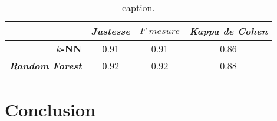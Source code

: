 \begin{table}[H]
    \centering
    \caption{caption.}
    \label{tab:l2ml_results}
    \begin{tabular}{@{}rccc@{}}
      \toprule
      \multicolumn{1}{l}{}              & \textit{Justesse}  &  $F\mbox{-} mesure$  & \textit{Kappa de Cohen}  \\ \midrule
      \textbf{$k$-NN}                   & 0.91               & 0.91                 & 0.86                     \\
      \textbf{\textit{Random Forest}}   & 0.92               & 0.92                 & 0.88                     \\ \bottomrule
    \end{tabular}
\end{table}

\section{Conclusion}
